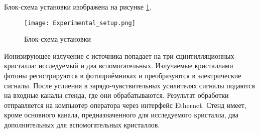 Блок-схема установки изображена на рисунке \ref{fig:exp_setup}.\par
\begin{figure}[ht]
    \centering
    \texttt{[image: Experimental\_setup.png]}
    \caption{Блок-схема установки}
    \label{fig:exp_setup}
\end{figure}
Ионизирующее излучение с источника попадает на три сцинтилляционных кристалла: исследуемый и два вспомогательных. Излучаемые кристаллами фотоны регистрируются в фотоприёмниках и преобразуются в электрические сигналы. После услиения в зарядо-чувствительных усилителях сигналы подаются на входные каналы стенда, где они обрабатываются. Результат обработки отправляется на компьютер оператора через интерфейс Ethernet. Стенд имеет, кроме основного канала, предназначенного для исследуемого кристалла, два дополнительных для вспомогательных кристаллов.\par
